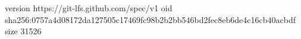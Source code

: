version https://git-lfs.github.com/spec/v1
oid sha256:0757a4d08172da127505c17469fc98b2b2bb546bd2fec8eb6de4c16cb40acbdf
size 31526
